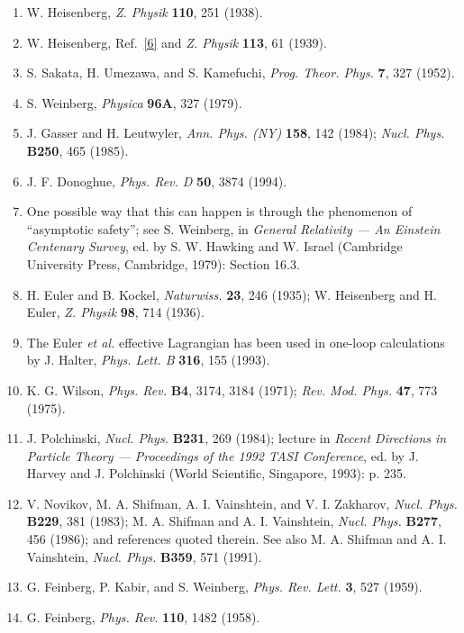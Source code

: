 \begin{enumerate}
\item\label{ref:12.9} W. Heisenberg, \emph{Z. Physik} \textbf{110}, 251
(1938).

\item\label{ref:12.10} W. Heisenberg,
Ref.~\hyperref[ref:12.6]{[6]} and \emph{Z. Physik} \textbf{113},
61 (1939).

\item\label{ref:12.11} S. Sakata, H. Umezawa, and S. Kamefuchi,
\emph{Prog. Theor. Phys.} \textbf{7}, 327 (1952).

\item\label{ref:12.12} S. Weinberg, \emph{Physica} \textbf{96A}, 327 (1979).

\item\label{ref:12.13} J. Gasser and H. Leutwyler, \emph{Ann. Phys. (NY)}
\textbf{158}, 142 (1984); \emph{Nucl. Phys.} \textbf{B250}, 465 (1985).

\item\label{ref:12.14} J. F. Donoghue, \emph{Phys. Rev. D} \textbf{50}, 3874
(1994).

\item\label{ref:12.15} One possible way that this can happen is through the
phenomenon of \textquotedblleft asymptotic safety\textquotedblright; see
S. Weinberg, in \emph{General Relativity --- An Einstein Centenary Survey},
ed. by S. W. Hawking and W. Israel (Cambridge University Press, Cambridge,
1979): Section 16.3.

\item\label{ref:12.16} H. Euler and B. Kockel, \emph{Naturwiss.} \textbf{23},
246 (1935); W. Heisenberg and H. Euler, \emph{Z. Physik} \textbf{98}, 714
(1936).

\item\label{ref:12.17} The Euler \emph{et al.} effective Lagrangian has been
used in one-loop calculations by J. Halter, \emph{Phys. Lett. B} \textbf{316},
155 (1993).

\item\label{ref:12.18} K. G. Wilson, \emph{Phys. Rev.} \textbf{B4}, 3174, 3184
(1971); \emph{Rev. Mod. Phys.} \textbf{47}, 773 (1975).

\item\label{ref:12.19} J. Polchinski, \emph{Nucl. Phys.} \textbf{B231}, 269
(1984); lecture in \emph{Recent Directions in Particle Theory --- Proceedings
of the 1992 TASI Conference}, ed. by J. Harvey and J. Polchinski (World
Scientific, Singapore, 1993): p. 235.

\item\label{ref:12.20} V. Novikov, M. A. Shifman, A. I. Vainshtein, and
V. I. Zakharov, \emph{Nucl. Phys.} \textbf{B229}, 381 (1983);
M. A. Shifman and A. I. Vainshtein, \emph{Nucl. Phys.} \textbf{B277}, 456
(1986); and references quoted therein. See also M. A. Shifman and
A. I. Vainshtein, \emph{Nucl. Phys.} \textbf{B359}, 571 (1991).

\item\label{ref:12.21} G. Feinberg, P. Kabir, and S. Weinberg,
\emph{Phys. Rev. Lett.} \textbf{3}, 527 (1959).

\item\label{ref:12.22} G. Feinberg, \emph{Phys. Rev.} \textbf{110}, 1482
(1958).
\end{enumerate}
